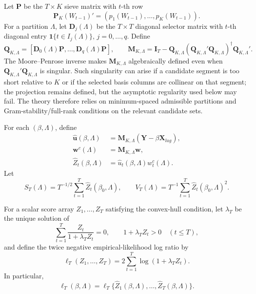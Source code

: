 \documentclass[12pt]{article}
\numberwithin{equation}{section}
\theoremstyle{definition}
\newcommand{\ind}{\mathbf 1}
\begin{document}
Let \(\bm P\) be the \(T\times K\) sieve matrix with \(t\)-th row
\[
    \bm P_K(W_{t-1})'=(p_1(W_{t-1}),\ldots,p_K(W_{t-1})).
\]
For a partition \(\Lambda\), let \(\bm D_j(\Lambda)\) be the \(T\times T\) diagonal selector matrix with \(t\)-th diagonal entry \(\ind\{t\in I_j(\Lambda)\}\), \(j=0,\ldots,q\). Define
\begin{equation}
    \bm Q_{K,\Lambda}
    =
    [\bm D_0(\Lambda)\bm P,\ldots,\bm D_q(\Lambda)\bm P],
    \qquad
    \bm M_{K,\Lambda}
    =
    \bm I_T-\bm Q_{K,\Lambda}
    (\bm Q_{K,\Lambda}'\bm Q_{K,\Lambda})^\dagger
    \bm Q_{K,\Lambda}'.
    \label{eq:primitive-qm}
\end{equation}
The Moore--Penrose inverse makes \(\bm M_{K,\Lambda}\) algebraically defined even when \(\bm Q_{K,\Lambda}'\bm Q_{K,\Lambda}\) is singular. Such singularity can arise if a candidate segment is too short relative to \(K\) or if the selected basis columns are collinear on that segment; the projection remains defined, but the asymptotic regularity used below may fail. The theory therefore relies on minimum-spaced admissible partitions and Gram-stability/full-rank conditions on the relevant candidate sets.

For each \((\beta,\Lambda)\), define
\begin{align}
    \widehat{\bm u}(\beta,\Lambda)
    &=
    \bm M_{K,\Lambda}(\bm Y-\beta\bm X_{lag}),
    \\
    \bm w^c(\Lambda)
    &=
    \bm M_{K,\Lambda}\bm w,
    \\
    \widehat Z_t(\beta,\Lambda)
    &=
    \widehat u_t(\beta,\Lambda)w_t^c(\Lambda).
\end{align}
Let
\[
    S_T(\Lambda)
    =
    T^{-1/2}\sum_{t=1}^T\widehat Z_t(\beta_0,\Lambda),
    \qquad
    V_T(\Lambda)
    =
    T^{-1}\sum_{t=1}^T\widehat Z_t(\beta_0,\Lambda)^2.
\]

For a scalar score array \(Z_1,\ldots,Z_T\) satisfying the convex-hull
condition, let \(\lambda_T\) be the unique solution of
\[
    \sum_{t=1}^T\frac{Z_t}{1+\lambda_T Z_t}=0,
    \qquad
    1+\lambda_T Z_t>0\quad(t\leq T),
\]
and define the twice negative empirical-likelihood log ratio by
\begin{equation}
    \ell_T(Z_1,\ldots,Z_T)
    =2\sum_{t=1}^T\log(1+\lambda_TZ_t).
    \label{eq:sol-el-definition}
\end{equation}
In particular,
\[
    \ell_T(\beta,\Lambda)
    =\ell_T\{\widehat Z_1(\beta,\Lambda),\ldots,
                    \widehat Z_T(\beta,\Lambda)\}.
\]
\end{document}
